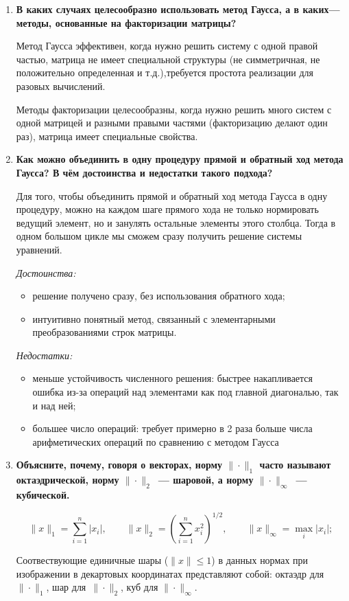 \documentclass[12pt, a4paper]{article}
\begin{document}
\begin{enumerate}
		\item \textbf{В каких случаях целесообразно использовать метод Гаусса, а в каких—методы, основанные на факторизации матрицы?}
		
		Метод Гаусса эффективен, когда нужно решить систему с одной правой частью, матрица не имеет специальной структуры (не симметричная, не положительно определенная и т.д.),требуется простота реализации для разовых вычислений.
		
		Методы факторизации целесообразны, когда нужно решить много систем с одной матрицей и разными правыми частями (факторизацию делают один раз), матрица имеет специальные свойства.
		
		\item \textbf{Как можно объединить в одну процедуру прямой и обратный ход метода Гаусса? В чём достоинства и недостатки такого подхода?}
		
		Для того, чтобы объединить прямой и обратный ход метода Гаусса в одну процедуру, можно на каждом шаге прямого хода не только нормировать ведущий элемент, но и занулять остальные элементы этого столбца. Тогда в одном большом цикле мы сможем сразу получить решение системы уравнений.
		
		\textit{Достоинства:}
		\begin{itemize}
			\item решение получено сразу, без использования обратного хода;
			\item интуитивно понятный метод, связанный с элементарными преобразованиями строк матрицы.
		\end{itemize}
		
		\textit{Недостатки:}
		\begin{itemize}
			\item меньше устойчивость численного решения: быстрее накапливается ошибка из-за операций над элементами как под главной диагональю, так и над ней;
			\item большее число операций: требует примерно в 2 раза больше числа арифметических операций по сравнению с методом Гаусса
		\end{itemize}
		
		\item\textbf{Объясните, почему, говоря о векторах, норму $\|\cdot\|_1$ часто называют октаэдрической, норму $\|\cdot\|_2$~--- шаровой, а норму $\|\cdot\|_\infty$~--- кубической.}
		
		\begin{equation*}
			\|x\|_1 = \sum \limits_{i = 1}^n |x_i|, \qquad \|x\|_2 = \left( \sum \limits_{i = 1}^n x_i^2 \right)^{1/2}, \qquad \|x\|_\infty = \max_i |x_i|;
		\end{equation*}
		
		Соотвествующие единичные шары ($\|x\| \le 1$) в данных нормах при изображении в декартовых координатах представляют собой: октаэдр для $\|\cdot\|_1$, шар для~$\|\cdot\|_2$, куб для $\|\cdot\|_\infty$.
		
	\end{enumerate}
	
\end{document}
